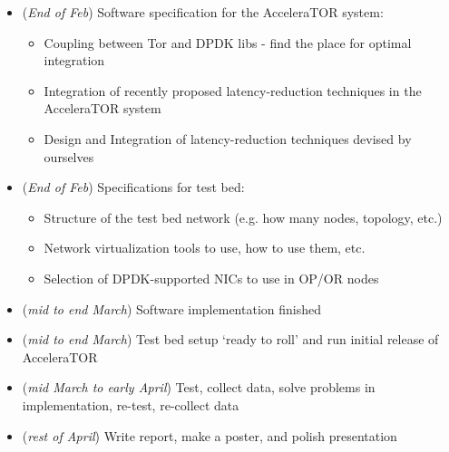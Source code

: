 \documentclass[conference]{IEEEtran}
\begin{document}
\begin{itemize}

	\item (\textit{End of Feb}) Software specification for the AcceleraTOR system: 

	\begin{itemize}

		\item Coupling between Tor and DPDK libs - find the place for optimal 
		integration

		\item Integration of recently proposed latency-reduction techniques in 
		the AcceleraTOR system
		
		\item Design and Integration of latency-reduction techniques devised 
		by ourselves

	\end{itemize}

	\item (\textit{End of Feb}) Specifications for test bed:

	\begin{itemize}

		\item Structure of the test bed network (e.g. how many nodes, topology, etc.)

		\item Network virtualization tools to use, how to use them, etc.

		\item Selection of DPDK-supported NICs to use in OP\slash OR nodes

	\end{itemize}

	\item (\textit{mid to end March}) Software implementation finished
	\item (\textit{mid to end March}) Test bed setup `ready to roll' and run initial release of 
		AcceleraTOR 
	\item (\textit{mid March to early April}) Test, collect data, solve problems in 
		implementation, re-test, re-collect data
	\item (\textit{rest of April}) Write report, make a poster, and polish presentation 

\end{itemize}
%




\end{document}
